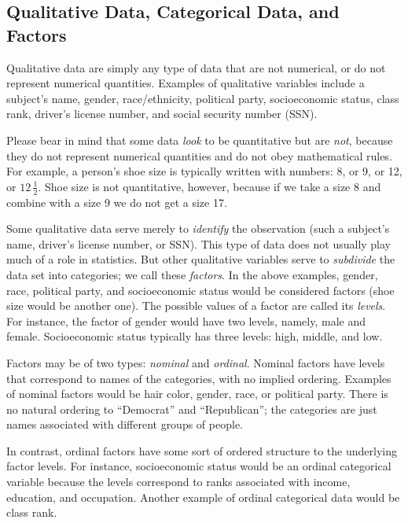 \documentclass[]{book}
\numberwithin{equation}{chapter}
\numberwithin{figure}{chapter}
\theoremstyle{plain}
\theoremstyle{definition}
\theoremstyle{remark}
\theoremstyle{definition}
\theoremstyle{definition}
\theoremstyle{remark}
\begin{document}
\subsection{Qualitative Data, Categorical Data, and
Factors}\label{sub-qualitative-data}

Qualitative data are simply any type of data that are not numerical, or
do not represent numerical quantities. Examples of qualitative variables
include a subject's name, gender, race/ethnicity, political party,
socioeconomic status, class rank, driver's license number, and social
security number (SSN).

Please bear in mind that some data \emph{look} to be quantitative but
are \emph{not}, because they do not represent numerical quantities and
do not obey mathematical rules. For example, a person's shoe size is
typically written with numbers: 8, or 9, or 12, or \(12\,\frac{1}{2}\).
Shoe size is not quantitative, however, because if we take a size 8 and
combine with a size 9 we do not get a size 17.

Some qualitative data serve merely to \emph{identify} the observation
(such a subject's name, driver's license number, or SSN). This type of
data does not usually play much of a role in statistics. But other
qualitative variables serve to \emph{subdivide} the data set into
categories; we call these \emph{factors}. In the above examples, gender,
race, political party, and socioeconomic status would be considered
factors (shoe size would be another one). The possible values of a
factor are called its \emph{levels}. For instance, the factor of gender
would have two levels, namely, male and female. Socioeconomic status
typically has three levels: high, middle, and low.

Factors may be of two types: \emph{nominal}  and
\emph{ordinal}.  Nominal factors have levels that
correspond to names of the categories, with no implied ordering.
Examples of nominal factors would be hair color, gender, race, or
political party. There is no natural ordering to ``Democrat'' and
``Republican''; the categories are just names associated with different
groups of people.

In contrast, ordinal factors have some sort of ordered structure to the
underlying factor levels. For instance, socioeconomic status would be an
ordinal categorical variable because the levels correspond to ranks
associated with income, education, and occupation. Another example of
ordinal categorical data would be class rank.
\end{document}
